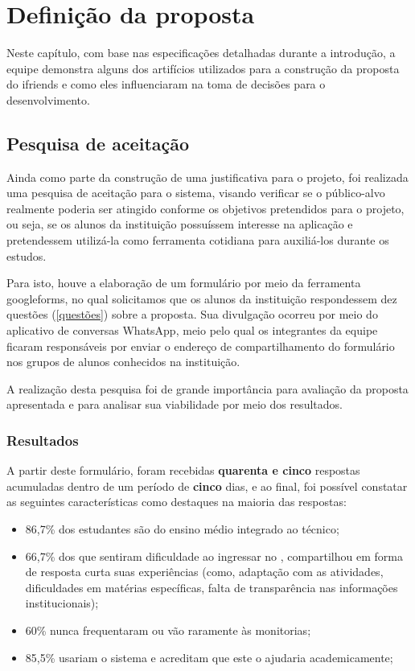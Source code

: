 \chapter{Definição da proposta}
Neste capítulo, com base nas especificações detalhadas durante a introdução, a equipe demonstra alguns dos artifícios utilizados para a construção da proposta do \gls{ifriends} e como eles influenciaram na toma de decisões para o desenvolvimento.

\section{Pesquisa de aceitação} 
\label{pesquisa}
Ainda como parte da construção de uma justificativa para o projeto, foi realizada uma pesquisa de aceitação para o sistema, visando verificar se o público-alvo realmente poderia ser atingido conforme os objetivos pretendidos para o projeto, ou seja, se os alunos da instituição possuíssem interesse na aplicação e pretendessem utilizá-la como ferramenta cotidiana para auxiliá-los durante os estudos.

Para isto, houve a elaboração de um formulário por meio da ferramenta \gls{googleforms}, no qual solicitamos que os alunos da instituição respondessem dez questões (\autoref{questões}) sobre a proposta. Sua divulgação ocorreu por meio do aplicativo de conversas \gls{WhatsApp}, meio pelo qual os integrantes da equipe ficaram responsáveis por enviar o endereço de compartilhamento do formulário nos grupos de alunos conhecidos na instituição.

A realização desta pesquisa foi de grande importância para avaliação da proposta apresentada e para analisar sua viabilidade por meio dos resultados.

\subsection{Resultados}
A partir deste formulário, foram recebidas \textbf{quarenta e cinco} respostas acumuladas dentro de um período de \textbf{cinco} dias, e ao final, foi possível constatar as seguintes características como destaques na maioria das respostas:


\begin{itemize}
    \item 86,7\% dos estudantes são do ensino médio integrado ao técnico;
    \item 66,7\% dos que sentiram dificuldade ao ingressar no , compartilhou em forma de resposta curta suas experiências (como, adaptação com as atividades, dificuldades em matérias específicas, falta de transparência nas informações institucionais);
    \item 60\% nunca frequentaram ou vão raramente às monitorias;
    \item 85,5\% usariam o sistema e acreditam que este o ajudaria academicamente;
\end{itemize}

